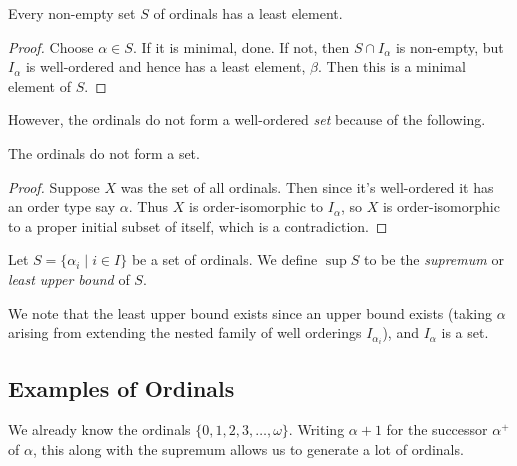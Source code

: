 \documentclass[a3paper, 10pt]{article}
\renewcommand{\vocab}[1]{\emph{#1}}
\begin{document}
\begin{multicols*}{5}
\begin{proposition}
  Every non-empty set $S$ of ordinals has a least element.
\end{proposition}
\begin{proof}
Choose $\alpha \in S$. If it is minimal, done. If not, then $S \cap I_\alpha$ is non-empty, but $I_\alpha$ is well-ordered and hence has a least element, $\beta$. Then this is a minimal element of $S$.
\end{proof}

However, the ordinals do not form a well-ordered \emph{set} because of the following.

\begin{theorem}
  The ordinals do not form a set.
\end{theorem}
\begin{proof}
  Suppose $X$ was the set of all ordinals. Then since it's well-ordered it has an order type say $\alpha$. Thus $X$ is order-isomorphic to $I_\alpha$, so $X$ is order-isomorphic to a proper initial subset of itself, which is a contradiction.
\end{proof}

\begin{definition}[Supremum]
  Let $S = \{\alpha_i \mid i \in I\}$ be a set of ordinals. We define $\sup S$ to be the \vocab{supremum} or \vocab{least upper bound} of $S$.
\end{definition}

We note that the least upper bound exists since an upper bound exists (taking $\alpha$ arising from extending the nested family of well orderings $I_{\alpha_i}$), and $I_{\alpha}$ is a set.

\subsection{Examples of Ordinals}
We already know the ordinals $\{0, 1, 2, 3, \dots, \omega\}$. Writing $\alpha + 1$ for the successor $\alpha^+$ of $\alpha$, this along with the supremum allows us to generate a lot of ordinals. 


\end{multicols*}
\end{document}
